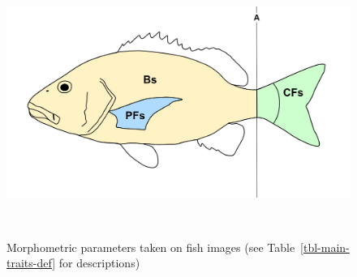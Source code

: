 \documentclass[
  letterpaper,
  DIV=11,
  numbers=noendperiod,
  oneside]{scrreprt}
\begin{document}
\begin{figure}
\begin{minipage}[t]{0.80\linewidth}
{{\includegraphics{./images/drawings/main_areas_sketch.png}

}

}

\end{minipage}%
%
\begin{minipage}[t]{0.10\linewidth}

{\centering 

~

}

\end{minipage}%

\caption{\label{fig-main-traits}Morphometric parameters taken on fish
images (see Table~\ref{tbl-main-traits-def} for descriptions)}

\end{figure}
\end{document}
